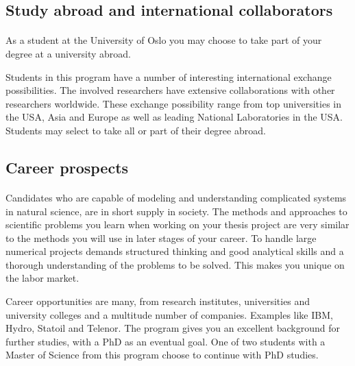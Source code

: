 \documentclass[%
twoside,                 %
final,                   %
10pt]{article}
\begin{document}
\noindent




\subsection{Study abroad and international collaborators}

\paragraph{}

As a student at the University of Oslo you may choose to take part of
your degree at a university abroad. 

Students in this program have a number of interesting international
exchange possibilities. The involved researchers have extensive
collaborations with other researchers worldwide. These exchange
possibility range from top universities in the USA, Asia and Europe as
well as leading National Laboratories in the USA.  Students may select
to take all or part of their degree abroad.





\subsection{Career prospects}

\paragraph{}
Candidates who are capable
of modeling and understanding complicated systems in natural science,
are in short supply in society.  The methods and approaches to
scientific problems you learn when working on your thesis project are
very similar to the methods you will use in later stages of your
career.  To handle large numerical projects demands structured
thinking and good analytical skills and a thorough understanding of
the problems to be solved. This makes you unique on the labor market.

Career opportunities are many, from research institutes, universities
and university colleges and a multitude number of companies. Examples
like IBM, Hydro, Statoil and Telenor.  The program gives you an
excellent background for further studies, with a PhD as an eventual
goal. One of two students with a Master of Science from this program
choose to continue with PhD studies.
\end{document}

